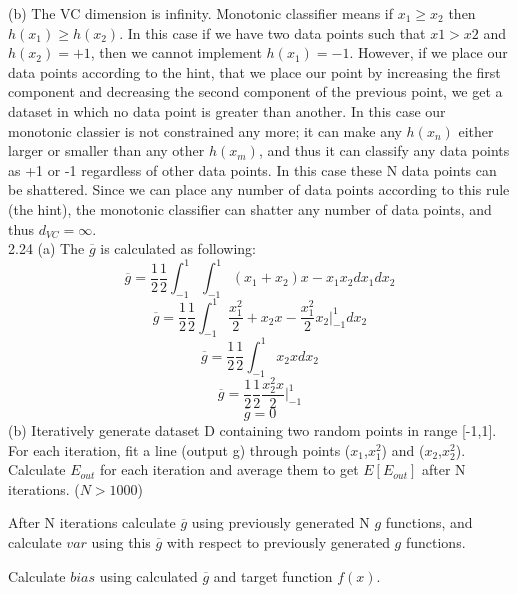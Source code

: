 \documentclass[12pt]{article}
\begin{document}
(b) The VC dimension is infinity. Monotonic classifier means if $x_1\geq x_2$ then $h(x_1)\geq h(x_2)$. In this case if we have two data points such that $x1>x2$ and $h(x_2)=+1$, then we cannot implement $h(x_1)=-1$. However, if we place our data points according to the hint, that we place our point by increasing the first component and decreasing the second component of the previous point, we get a dataset in which no data point is greater than another. In this case our monotonic classier is not constrained any more; it can make any $h(x_n)$ either larger or smaller than any other $h(x_m)$, and thus it can classify any data points as +1 or -1 regardless of other data points. In this case these N data points can be shattered. Since we can place any number of data points according to this rule (the hint), the monotonic classifier can shatter any number of data points, and thus $d_{VC}=\infty$.\\ 
2.24
(a) The $\overline{g}$ is calculated as following:
$$\overline{g} = \frac{1}{2}\frac{1}{2} \int_{-1}^1\int_{-1}^1 (x_1+x_2)x-x_1x_2  dx_1dx_2$$
$$\overline{g} = \frac{1}{2}\frac{1}{2} \int_{-1}^1 \frac{x_1^2}{2}+x_2x-\frac{x_1^2}{2}x_2  \big|^1_{-1} dx_2$$
$$\overline{g} = \frac{1}{2}\frac{1}{2} \int_{-1}^1 x_2xdx_2$$
$$\overline{g} = \frac{1}{2}\frac{1}{2} \frac{x_2^2x}{2} \big|^1_{-1}$$
$$\overline{g} = 0$$
(b) Iteratively generate dataset D containing two random points in range [-1,1]. For each iteration, fit a line (output g) through points ($x_1$,$x_1^2$) and ($x_2$,$x_2^2$). Calculate $E_{out}$ for each iteration and average them to get $E[E_{out}]$ after N iterations. ($N>1000$)

After N iterations calculate $\overline{g}$ using previously generated N $g$ functions, and calculate $var$ using this $\overline{g}$ with respect to previously generated $g$ functions.

Calculate $bias$ using calculated $\overline{g}$ and target function $f(x)$.
\end{document}
